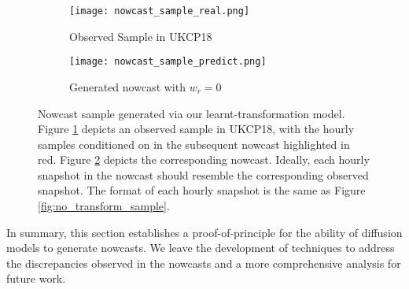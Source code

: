 \documentclass[ oneside,%
                    author={George Herbert},
                    degree={MSci},
                     title={Diffusion Models for Time-Evolving Precipitation Fields},
                  subtitle={}]{dissertation}
\begin{document}
\begin{figure}[htbp]
      \centering
      \begin{subfigure}{\textwidth}
            \texttt{[image: nowcast\_sample\_real.png]}
            \caption{Observed Sample in UKCP18}
            \label{fig:nowcast_sample_real}
      \end{subfigure}
      \begin{subfigure}{\textwidth}
            \texttt{[image: nowcast\_sample\_predict.png]}
            \caption{Generated nowcast with $w_r=0$}
            \label{fig:nowcast_sample_predict}
      \end{subfigure}
      \caption{Nowcast sample generated via our learnt-transformation model. Figure \ref{fig:nowcast_sample_real} depicts an observed sample in UKCP18, with the hourly samples conditioned on in the subsequent nowcast highlighted in red. Figure \ref{fig:nowcast_sample_predict} depicts the corresponding nowcast. Ideally, each hourly snapshot in the nowcast should resemble the corresponding observed snapshot. The format of each hourly snapshot is the same as Figure \ref{fig:no_transform_sample}.}
      \label{fig:nowcast_sample}
\end{figure}

In summary, this section establishes a proof-of-principle for the ability of diffusion models to generate nowcasts. We leave the development of techniques to address the discrepancies observed in the nowcasts and a more comprehensive analysis for future work.




\end{document}
